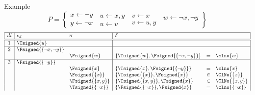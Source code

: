 \begin{frame}[shrink=0]{Example}
  \[
    P
    =
    \left\{
      \begin{array}{l}
        x  \leftarrow  \neg y\\
        y  \leftarrow  \neg x
      \end{array}
      \
      \begin{array}{l}
        u  \leftarrow x,y\\
        u  \leftarrow v
      \end{array}
      \
      \begin{array}{l}
        v  \leftarrow x\\
        v  \leftarrow u,y
      \end{array}
      \
      \begin{array}{l}
        w  \leftarrow \neg x,\neg y\\
        \mbox{~}
      \end{array}
    \right\}
  \]
  \medskip\footnotesize
  \[
    \begin{array}[b]{|c|ll|lcl|}
      \hline
      \mathit{dl}&\sigma_{\!d}               &\overline{\sigma}    &\delta                                           &   &
      \\\hline\hline
      1          &\Tsigned{u}                &                     &                                                 &   &
      \\\hline
      2          &\Fsigned{\{\neg x,\neg y\}}&                     &                                                 &   &
      \\
                 &                           &\Fsigned{w}          &\{\Tsigned{w},\Fsigned{\{\neg x,\neg y\}}\}      & = &\clno{w}
      \\\hline
      3          &\Fsigned{\{\neg y\}}       &                     &                                                 &   &
      \\
                 &                           &\Fsigned{x}          &\{\Tsigned{x},\Fsigned{\{\neg y\}}\}             & = &\clno{x}
      \\
                 &                           &\Fsigned{\{x\}}      &\{\Tsigned{\{x\}},\Fsigned{x}\}                  &\in&\ClNo{\{x\}}
      \\
                 &                           &\Fsigned{\{x,y\}}    &\{\Tsigned{\{x,y\}},\Fsigned{x}\}                &\in&\ClNo{\{x,y\}}
      \\
                 &                           &\Tsigned{\{\neg x\}} &\{\Fsigned{\{\neg x\}},\Fsigned{x}\}             & = &\clno{\{\neg x\}}

\end{array}\]
\end{frame}

